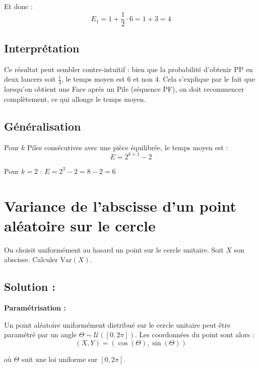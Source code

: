 Et donc :
\[
E_1 = 1 + \frac{1}{2} \cdot 6 = 1 + 3 = 4
\]



\begin{center}
\end{center}

\subsection*{Interprétation}

Ce résultat peut sembler contre-intuitif : bien que la probabilité d'obtenir PP en deux lancers soit $\frac{1}{4}$, le temps moyen est 6 et non 4. Cela s'explique par le fait que lorsqu'on obtient une Face après un Pile (séquence PF), on doit recommencer complètement, ce qui allonge le temps moyen.

\subsection*{Généralisation}

Pour $k$ Piles consécutives avec une pièce équilibrée, le temps moyen est :
\[
E = 2^{k+1} - 2
\]

Pour $k=2$ : $E = 2^3 - 2 = 8 - 2 = 6$ \quad {}


\section{Variance de l'abscisse d'un point aléatoire sur le cercle}

\begin{exerciseBox}
On choisit uniformément au hasard un point sur le cercle unitaire. Soit $X$ son abscisse. Calculer $\text{Var}(X)$.
\end{exerciseBox}

\subsection*{Solution :}

\textbf{Paramétrisation :}

Un point aléatoire uniformément distribué sur le cercle unitaire peut être paramétré par un angle $\Theta \sim \mathcal{U}([0, 2\pi])$. Les coordonnées du point sont alors :
\[
(X, Y) = (\cos(\Theta), \sin(\Theta))
\]

où $\Theta$ suit une loi uniforme sur $[0, 2\pi]$.

